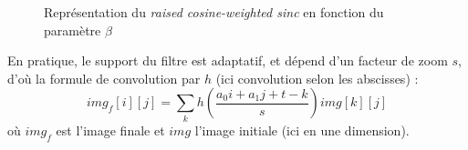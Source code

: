	\begin{figure}
		\centering
		\caption{Représentation du \emph{raised cosine-weighted sinc} en fonction du paramètre $\beta$}
		\label{szeliski_plotRaisedCosine (cf. partie \ref{label_figure_dom_reel_fourier_jt})}
	\end{figure}
	
	En pratique, le support du filtre est adaptatif, et dépend d'un facteur de zoom $s$, d'où la formule de convolution par $h$ (ici convolution selon les abscisses) :
	\begin{equation}
	img_f[i][j] = \displaystyle{\sum_k}h\left(\frac{a_0i+a_1j+t-k}{s}\right)img[k][j]
	\label{formule_convolution_discrete}
	\end{equation}
	où $img_f$ est l'image finale et $img$ l'image initiale (ici en une dimension).
	
